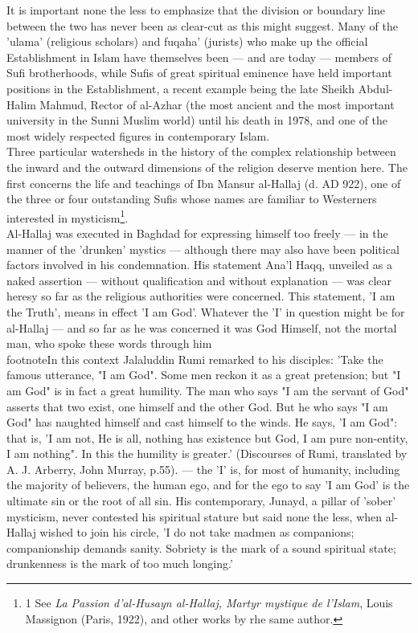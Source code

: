 \documentclass[11pt, b5paper, twoside]{book}
\begin{document}
It is important none the less to emphasize that the division or boundary line between the two has 
never been as clear-cut as this might suggest. Many of the 'ulama' (religious scholars) and fuqaha' 
(jurists) who make up the official Establishment in Islam have themselves been --- and are today --- 
members of Sufi brotherhoods, while Sufis of great spiritual eminence have held important positions 
in the Establishment, a recent example being the late Sheikh Abdul-Halim Mahmud, Rector of al-Azhar 
(the most ancient and the most important university in the Sunni Muslim world) until his death in 
1978, and one of the most widely respected figures in contemporary Islam. \\

Three particular watersheds in the history of the complex relationship between the inward and the 
outward dimensions of the religion deserve mention here. The first concerns the life and teachings of 
Ibn Mansur al-Hallaj (d. AD 922), one of the three or four outstanding Sufis whose names are familiar 
to Westerners interested in mysticism\footnote{1 See \emph{La Passion d'al-Husayn al-Hallaj, Martyr mystique de l'Islam}, Louis Massignon (Paris, 1922), and other works by rhe same author.}.\\

Al-Hallaj was executed in Baghdad for expressing himself too freely --- in the manner of the 'drunken' 
mystics --- although there may also have been political factors involved in his condemnation. His 
statement Ana'l Haqq, unveiled as a naked assertion --- without qualification and without explanation --- 
was clear heresy so far as the religious authorities were concerned. This statement, 'I am the 
Truth', means in effect 'I am God'. Whatever the 'I' in question might be for al-Hallaj --- and so far 
as he was concerned it was God Himself, not the mortal man, who spoke these words through him\\footnote{In this context Jalaluddin Rumi remarked to his disciples: 'Take the famous utterance, "I am God". 
Some men reckon it as a great pretension; but "I am God" is in fact a great humility. The man who 
says "I am the servant of God" asserts that two exist, one himself and the other God. But he who says 
"I am God" has naughted himself and cast himself to the winds. He says, 'I am God": that is, 'I am 
not, He is all, nothing has existence but God, I am pure non-entity, I am nothing". In this the 
humility is greater.' (Discourses of Rumi, translated by A. J. Arberry, John Murray, p.55).} --- 
the 'I' is, for most of humanity, including the majority of believers, the human ego, and for the ego 
to say 'I am God' is the ultimate sin or the root of all sin. His contemporary, Junayd, a pillar of 
'sober' mysticism, never contested his spiritual stature but said none the less, when al-Hallaj 
wished to join his circle, 'I do not take madmen as companions; companionship demands sanity. 
Sobriety is the mark of a sound spiritual state; drunkenness is the mark of too much longing.' \\
\end{document}
